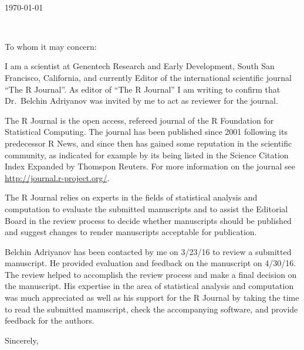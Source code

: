 \documentclass[11pt,a4paper]{letter} %
\def\opening#1{\thispagestyle{empty}
  {\centering\fromaddress \vspace{0.6in} \\ %
    \hspace*{\longindentation}\today\hspace*{\fill}\par} %
  {\raggedright \toname \\ \toaddress \par} %
  \vspace{0.4in} %
  \noindent #1 %
}
\begin{document}

\begin{letter}{}
  
  \opening{To whom it may concern:}

  I am a scientist at Genentech Research and Early Development, South
  San Francisco, California, and currently Editor of the international
  scientific journal ``The R Journal''. As editor of ``The R Journal'' I
  am writing to confirm that Dr.~Belchin Adriyanov was invited by me to
  act as reviewer for the journal.

  The R Journal is the open access, refereed journal of the R Foundation
  for Statistical Computing. The journal has been published since
  2001 following its predecessor R News, and since then has gained some
  reputation in the scientific community, as indicated for example by
  its being listed in the Science Citation Index Expanded by Thomspon
  Reuters. For more information on the journal see
  \url{http://journal.r-project.org/}.

  The R Journal relies on experts in the fields of statistical analysis
  and computation to evaluate the submitted manuscripts and to assist
  the Editorial Board in the review process to decide whether
  manuscripts should be published and suggest changes to render
  manuscripts acceptable for publication.

  Belchin Adriyanov has been contacted by me on 3/23/16 to review a
  submitted manuscript. He provided evaluation and feedback on the
  manuscript on 4/30/16. The review helped to accomplish the review
  process and make a final decision on the manuscript. His expertise in
  the area of statistical analysis and computation was much appreciated
  as well as his support for the R Journal by taking the time to read
  the submitted manuscript, check the accompanying software, and provide
  feedback for the authors.

  \closing{Sincerely,}

\end{letter}
\end{document}
